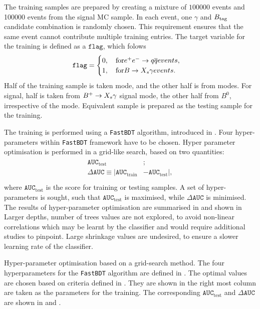The training samples are prepared by creating a mixture of $100000$ \epem\ra\qqbar events and 100000 \BtoXsgamma events from the signal MC sample.
In each event, one $\gamma$ and $B_{\mathrm{tag}}$ candidate combination is randomly chosen.
This requirement ensures that the same event cannot contribute multiple training entries.
The target variable for the training is defined as a $\mathtt{flag}$, which folows
\begin{equation}
    \mathtt{flag}=\begin{cases}
      0,\quad \mathrm{for} \epem\ra\qqbar events,\\ 
      1,\quad \mathrm{for} \BtoXsgamma events.
      \end{cases}
\end{equation}
Half of the \epem\ra\qqbar training sample is taken \feiBp mode, and the other half is from \feiBz modes. 
For signal, half is taken from $\BptoXsgamma$ signal mode, the other half from $B^0$, irrespective of the \FEI mode.
Equivalent sample is prepared as the testing sample for the training.

The training is performed using a \texttt{FastBDT} algorithm, introduced in .
Four hyper-parameters within \texttt{FastBDT} framework have to be chosen.
Hyper parameter optimisation is performed in a grid-like search, based on two quantities:
\begin{align}\label{eq:optimisation_criteria}
    \begin{split}
    \mathtt{AUC}_{\mathrm{test}}&;\\
    \Delta \mathtt{AUC} \equiv |\mathtt{AUC}_{\mathrm{train}}& - \mathtt{AUC}_{\mathrm{test}}|,\\
    \end{split}
\end{align}
where $\mathtt{AUC}_{\mathrm{test}}$ is the \AUC score for training or testing samples.
A set of hyper-parameters is sought, such that $ \mathtt{AUC}_{\mathrm{test}}$ is maximised, while $\Delta \mathtt{AUC}$ is minimised.
The results of hyper-parameter optimisation are summarised in  and shown in 
Larger depths, number of trees values are not explored, to avoid non-linear correlations which may be learnt by the classifier and would require additional studies to pinpoint.
Large shrinkage values are undesired, to ensure a slower learning rate of the classifier.

\begin{table}[htbp!]
    \centering
    \caption{\label{tab:grid_search}Hyper-parameter optimisation based on a grid-search method.
    The four hyperparameters for the \texttt{FastBDT} algorithm are defined in .
    The optimal values are chosen based on criteria defined in .
    They are shown in the right most column are taken as the parameters for the training.
    The corresponding $\mathtt{AUC}_{\mathrm{test}}$ and $\Delta \mathtt{AUC}$ are shown in  and .
    }
    
\end{table}

